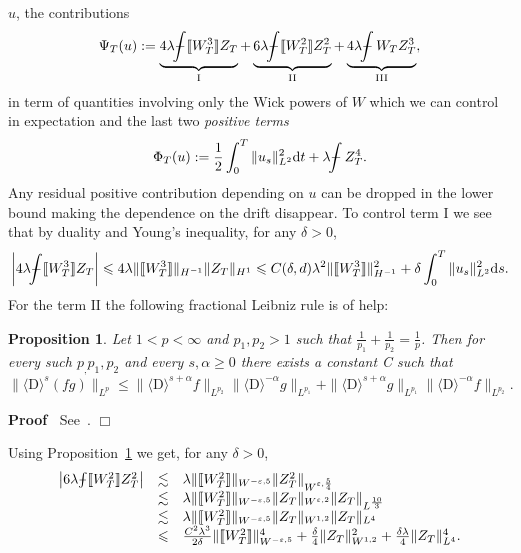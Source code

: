 \documentclass[11pt, oneside]{article}   	%
\newcommand{\Iota}{\mathrm{I}}
\newcommand{\assign}{:=}
\newcommand{\mathD}{\mathrm{D}}
\newcommand{\mathd}{\mathrm{d}}
\newcommand{\tmtextit}[1]{{\itshape{#1}}}
\newenvironment{proof}{\noindent\textbf{Proof\ }}{\hspace*{\fill}$\Box$\medskip}
\newtheorem{proposition}{Proposition}
{\theorembodyfont{\rmfamily}\newtheorem{remark}{Remark}}
\def\Xint#1{\mathchoice
{\XXint\displaystyle\textstyle{#1}}%
{\XXint\textstyle\scriptstyle{#1}}%
{\XXint\scriptstyle\scriptscriptstyle{#1}}%
{\XXint\scriptscriptstyle\scriptscriptstyle{#1}}%
\!\int}
\def\XXint#1#2#3{{\setbox0=\hbox{$#1{#2#3}{\int}$ }
\vcenter{\hbox{$#2#3$ }}\kern-.6\wd0}}
\def\dashint{\Xint-}
\newcommand{\bint}{\dashint}
\begin{document}
$u$, the contributions
\[ \Psi_T (u) \assign \underbrace{4 \lambda \bint \llbracket W_T^3 \rrbracket
   Z_T}_{\Iota} + \underbrace{6 \lambda \bint \llbracket W_T^2 \rrbracket
   Z_T^2}_{\Iota \Iota} + \underbrace{4 \lambda \bint W_T Z_T^3}_{\Iota \Iota
   \Iota}, \]
in term of quantities involving only the Wick powers of $W$ which we can
control in expectation and the last two \tmtextit{positive terms}
\[ \Phi_T (u) \assign \frac{1}{2} \int_0^T \| u_s \|^2_{L^2} \mathd t +
   \lambda \bint Z_T^4 . \]
Any residual positive contribution depending on $u$ can be dropped in the
lower bound making the dependence on the drift disappear. To control term
$\Iota$ we see that by duality and Young's inequality, for any $\delta > 0$,
\begin{equation}
  \left| 4 \lambda \bint \llbracket W_T^3 \rrbracket Z_T \right| \leqslant 4
  \lambda \| \llbracket W_T^3 \rrbracket \|_{H^{- 1}} \| Z_T \|_{H^1}
  \leqslant C (\delta, d) \lambda^2 \| \llbracket W_T^3 \rrbracket \|_{H^{-
  1}}^2 + \delta \int_0^T \| u_s \|^2_{L^2} \mathd s. \label{eq:term-i}
\end{equation}
For the term $\Iota \Iota$ the following fractional Leibniz rule is of help:

\begin{proposition}
  \label{FractionalLeibniz}Let $1 < p < \infty$ and $p_1, p_2 > 1$ such that
  $\frac{1}{p_1} + \frac{1}{p_2} = \frac{1}{p}$. Then for every such $p_, p_1,
  p_2$ and every $s, \alpha \geq 0$ there exists a constant C such that
  \[ \| \langle \mathD \rangle^s (f g) \|_{L^p} \leq \| \langle \mathD
     \rangle^{s + \alpha} f \|_{L^{p_2}}  \| \langle \mathD \rangle^{- \alpha}
     g \|_{L^{p_1}} + \| \langle \mathD \rangle^{s + \alpha} g \|_{L^{p_1}} 
     \| \langle \mathD \rangle^{- \alpha} f \|_{L^{p_2}} . \]
\end{proposition}

\begin{proof}
  See~{\cite{gulisashvili_exact_1996}}.
\end{proof}

Using Proposition~\ref{FractionalLeibniz} we get, for any $\delta > 0$,
\begin{equation}
  \begin{array}{lll}
    \left| 6 \lambda \bint \llbracket W_T^2 \rrbracket Z_T^2  \right| &
    \lesssim & \lambda \| \llbracket W_T^2 \rrbracket \|_{W^{- \varepsilon,
    5}} \| Z_T^2 \|_{W^{\varepsilon, \frac{5}{4}}}\\
    & \lesssim & \lambda \| \llbracket W_T^2 \rrbracket \|_{W^{- \varepsilon,
    5}} \| Z_T \|_{W^{\varepsilon, 2}} \| Z_T \|_{L^{\frac{10}{3}}}\\
    & \lesssim & \lambda \| \llbracket W_T^2 \rrbracket \|_{W^{- \varepsilon,
    5}} \| Z_T \|_{W^{1, 2}} \| Z_T \|_{L^4}\\
    & \leqslant & \frac{C^2 \lambda^3}{2 \delta} \| \llbracket W_T^2
    \rrbracket \|^4_{W^{- \varepsilon, 5}} + \frac{\delta}{4} \| Z_T
    \|^2_{W^{1, 2}} + \frac{\delta \lambda}{4} \| Z_T \|_{L^4}^4 .
  \end{array} \label{eq:term-ii}
\end{equation}
\end{document}
